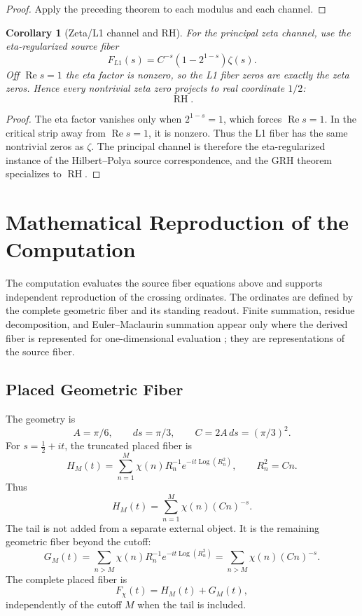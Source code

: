 \documentclass[11pt]{article}
\newtheorem{corollary}[definition]{Corollary}
\DeclareMathOperator{\Ree}{Re}
\DeclareMathOperator{\RH}{RH}
\DeclareMathOperator{\Log}{Log}
\begin{document}
\begin{proof}
Apply the preceding theorem to each modulus and each channel.
\end{proof}

\begin{corollary}[Zeta/L1 channel and RH]
For the principal zeta channel, use the eta-regularized source fiber
\[
  F_{L1}(s)=C^{-s}(1-2^{1-s})\zeta(s).
\]
Off $\Ree s=1$ the eta factor is nonzero, so the L1 fiber zeros are exactly the
zeta zeros.  Hence every nontrivial zeta zero projects to real coordinate
$1/2$:
\[
  \RH.
\]
\end{corollary}

\begin{proof}
The eta factor vanishes only when $2^{1-s}=1$, which forces $\Ree s=1$.  In the
critical strip away from $\Ree s=1$, it is nonzero.  Thus the L1 fiber has the
same nontrivial zeros as $\zeta$.  The principal channel is therefore the
eta-regularized instance of the Hilbert--Polya source correspondence, and the
GRH theorem specializes to $\RH$.
\end{proof}

\section{Mathematical Reproduction of the Computation}

The computation evaluates the source fiber equations above and supports
independent reproduction of the crossing ordinates.  The ordinates are defined
by the complete geometric fiber and its standing readout.  Finite summation,
residue decomposition, and Euler--Maclaurin summation appear only where the
derived fiber is represented for one-dimensional evaluation \cite{Apostol1976};
they are representations of the source fiber.

\subsection{Placed Geometric Fiber}

The geometry is
\[
  A=\pi/6,\qquad ds=\pi/3,\qquad C=2A\,ds=(\pi/3)^2.
\]
For $s=\frac12+it$, the truncated placed fiber is
\[
  H_M(t)
  =
  \sum_{n=1}^M \chi(n)R_n^{-1}e^{-it\Log(R_n^2)},
  \qquad R_n^2=Cn.
\]
Thus
\[
  H_M(t)=\sum_{n=1}^M \chi(n)(Cn)^{-s}.
\]
The tail is not added from a separate external object.  It is the remaining
geometric fiber beyond the cutoff:
\[
  G_M(t)
  =
  \sum_{n>M}\chi(n)R_n^{-1}e^{-it\Log(R_n^2)}
  =
  \sum_{n>M}\chi(n)(Cn)^{-s}.
\]
The complete placed fiber is
\[
  F_\chi(t)=H_M(t)+G_M(t),
\]
independently of the cutoff $M$ when the tail is included.
\end{document}
